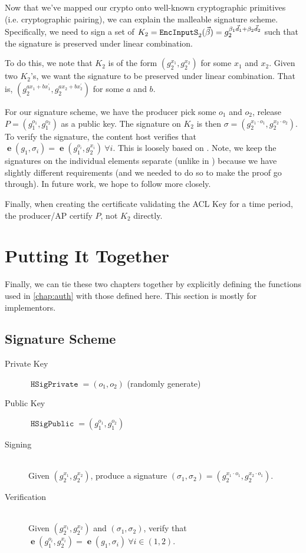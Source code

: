 \documentclass[pdftex,12pt,a4papaer,twoside,notitlepage]{report}
\DeclareMathOperator{\e}{\mathbf{e}}
\DeclareMathOperator{\eins}{\mathtt{EncInputS}}
\DeclareMathOperator{\Hp}{\mathtt{HSigPublic}}
\DeclareMathOperator{\Hs}{\mathtt{HSigPrivate}}
\begin{document}
Now that we've mapped our crypto onto well-known cryptographic primitives (i.e.
cryptographic pairing), we can explain the malleable signature scheme.
Specifically, we need to sign a set of $K_2 = \eins_2(\Bp) =
g_2^{\beta_1\vec{d}_1 + \beta_2\vec{d}_2}$ such that the signature is preserved
under linear combination.

To do this, we note that $K_2$ is of the form $(g_2^{x_1}, g_2^{x_2})$ for some
$x_1$ and $x_2$. Given two $K_2$'s, we want the signature to be preserved under
linear combination. That is, $(g_2^{a x_1 + b x_1^\prime}, g_2^{a x_2 + b
  x_2^\prime})$ for some $a$ and $b$.

For our signature scheme, we have the producer pick some $o_1$ and $o_2$,
release $P = (g_1^{o_1}, g_1^{o_2})$ as a public key. The signature on $K_2$ is
then $\sigma = (g_2^{x_1\cdot o_1}, g_2^{x_2\cdot o_2})$. To verify the
signature, the content host verifies that $\e(g_1, \sigma_i) = \e(g_1^{o_i},
g_2^{x_i})~ \forall i$. This is loosely based on \cite{signature}. Note, we keep
the signatures on the individual elements separate (unlike in \cite{signature})
because we have slightly different requirements (and we needed to do so to make
the proof go through). In future work, we hope to follow \cite{signature} more
closely.

Finally, when creating the certificate validating the ACL Key for a time period,
the producer/AP certify $P$, not $K_2$ directly.

\section{Putting It Together}

Finally, we can tie these two chapters together by explicitly defining the
functions used in \cref{chap:auth} with those defined here. This section is
mostly for implementors.

\subsection{Signature Scheme}

\begin{description}
  \item[Private Key] $\Hs = (o_1, o_2)$ (randomly generate)
  \item[Public Key] $\Hp = (g_1^{o_1}, g_1^{o_2})$
  \item[Signing] \hfill \\
    Given $(g_2^{x_1}, g_2^{x_2})$, produce a signature $(\sigma_1, \sigma_2) = (g_2^{x_1\cdot o_1}, g_2^{x_2\cdot o_1})$.
  \item[Verification] \hfill \\
    Given $(g_2^{x_1}, g_2^{x_2})$ and $(\sigma_1, \sigma_2)$,
    verify that $\e(g_1^{o_i}, g_2^{x_i}) = \e(g_1, \sigma_i)~\forall i \in (1, 2)$.
\end{description}
\end{document}
